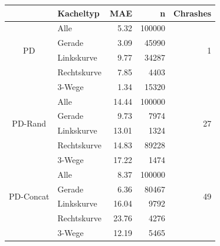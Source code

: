 \begin{tabular}[t]{|c|l|r|r|r|}
	\hline
	& \textbf{Kacheltyp} & \textbf{MAE} & \textbf{n} & Chrashes \\
	\hline
	\multirow{4}{*}{PD} 
	& Alle
	& 5.32
	& 100000
	& \multirow{4}{*}{1}\\
	\cline{2-4}
	& Gerade
	&  3.09
	& 45990
	&\\
	\cline{2-4}
	& Linkskurve
	& 9.77
	& 34287
	&\\
	\cline{2-4}
	& Rechtskurve
	& 7.85
	& 4403
	&\\
	\cline{2-4}
	& 3-Wege
	&  1.34
	& 15320
	&\\
	\hline
	\multirow{4}{*}{PD-Rand} 
	& Alle
	& 14.44
	& 100000
	& \multirow{4}{*}{27}\\
	\cline{2-4}
	& Gerade
	&  9.73
	& 7974
	& \\
	\cline{2-4}
	& Linkskurve
	& 13.01
	& 1324
	&\\
	\cline{2-4}
	& Rechtskurve
	& 14.83
	& 89228
	&\\
	\cline{2-4}
	& 3-Wege
	& 17.22
	& 1474
	&\\
	\hline
	\multirow{4}{*}{PD-Concat} 
	& Alle
	& 8.37
	& 100000
	& \multirow{4}{*}{49}\\
	\cline{2-4}
	& Gerade
	& 6.36
	& 80467
	&\\
	\cline{2-4}
	& Linkskurve
	& 16.04
	& 9792
	&\\
	\cline{2-4}
	& Rechtskurve
	& 23.76
	& 4276
	&\\
	\cline{2-4}
	& 3-Wege
	& 12.19
	& 5465
	&\\
	\hline
\end{tabular}
